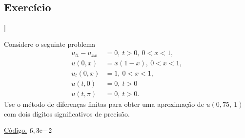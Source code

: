 \subsection*{Exercício}

\begin{flushleft}
  [[tag:revisar]]
\end{flushleft}

\begin{exer}
  Considere o seguinte problema
  \begin{align}
    u_{tt} - u_{xx} &= 0,~t>0,~0< x < 1,\\
    u(0,x) &= x(1-x),~0<x<1,\\
    u_t(0,x) &= 1,~0<x<1,\\
    u(t,0) &= 0,~t>0\\
    u(t,\pi) &= 0,~t>0.
  \end{align}
Use o método de diferenças finitas para obter uma aproximação de $u(0,75,~1)$ com dois dígitos significativos de precisão.
\end{exer}
\begin{resp}
  \ifisoctave 
  \href{https://github.com/phkonzen/notas/blob/master/src/MatematicaNumerica/cap_edp/dados/exer_edp_onda_1/exer_edp_onda_1.m}{Código.} 
  \fi
  $6,3\mathrm{e}\!-\!2$
\end{resp}